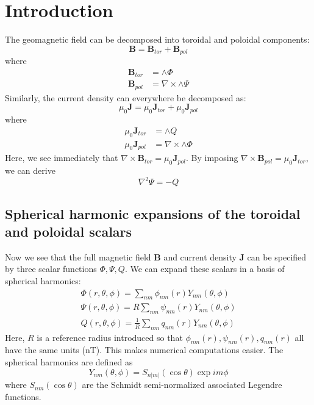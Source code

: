 \documentclass{article}
\newcommand{\B}{\mathbf{B}}
\newcommand{\J}{\mathbf{J}}
\begin{document}
\section{Introduction}

The geomagnetic field can be decomposed into toroidal and poloidal
components:
\begin{equation}
\B = \B_{tor} + \B_{pol}
\end{equation}
where
\begin{align}
\B_{tor} &= \wedge \Phi \\
\B_{pol} &= \nabla \times \wedge \Psi
\end{align}
Similarly, the current density can everywhere be decomposed as:
\begin{equation}
\mu_0 \J = \mu_0 \J_{tor} + \mu_0 \J_{pol}
\end{equation}
where
\begin{align}
\mu_0 \J_{tor} &= \wedge Q \\
\mu_0 \J_{pol} &= \nabla \times \wedge \Phi
\end{align}
Here, we see immediately that $\nabla \times \B_{tor} = \mu_0 \J_{pol}$.
By imposing $\nabla \times \B_{pol} = \mu_0 \J_{tor}$, we can derive
\begin{equation}
\nabla^2 \Psi = -Q
\end{equation}

\subsection{Spherical harmonic expansions of the toroidal and poloidal scalars}

Now we see that the full magnetic field $\B$ and current density $\J$
can be specified by three scalar functions $\Phi,\Psi,Q$. We can
expand these scalars in a basis of spherical harmonics:
\begin{align}
\Phi(r,\theta,\phi) = \sum_{nm} \phi_{nm}(r) Y_{nm}(\theta,\phi) \\
\Psi(r,\theta,\phi) = R \sum_{nm} \psi_{nm}(r) Y_{nm}(\theta,\phi) \\
Q(r,\theta,\phi) = \frac{1}{R} \sum_{nm} q_{nm}(r) Y_{nm}(\theta,\phi)
\end{align}
Here, $R$ is a reference radius introduced so that
$\phi_{nm}(r),\psi_{nm}(r),q_{nm}(r)$ all have the same units (nT).
This makes numerical computations easier. The spherical harmonics
are defined as
\begin{equation}
Y_{nm}(\theta,\phi) = S_{n|m|}(\cos{\theta}) \exp{im\phi}
\end{equation}
where $S_{nm}(\cos{\theta})$ are the Schmidt semi-normalized associated
Legendre functions.
\end{document}
